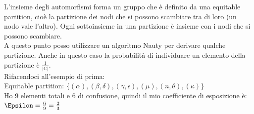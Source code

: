 L’insieme degli automorfismi forma un gruppo che è definito da una equitable partition, cioè la partizione dei nodi che si possono scambiare tra di loro (un nodo vale l’altro). Ogni sottoinsieme in una partizione è insieme con i nodi che si possono scambiare.\\
A questo punto posso utilizzare un algoritmo Nauty per derivare qualche partizione. Anche in questo caso la probabilità di individuare un elemento della partizione è \( \frac{1}{|C|}\).\\
Rifacendoci all'esempio di prima:\\
Equitable partition: \(\{(\alpha),(\beta,\delta),(\gamma, \epsilon),(\mu), (n,\theta),(\kappa)\}\) \\
Ho 9 elementi totali e 6 di confusione, quindi il mio coefficiente di esposizione è:
\(\Epsilon = \frac{6}{9} = \frac{2}{3} \)

